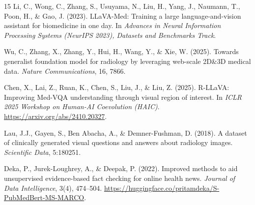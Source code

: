 \documentclass{article}
\begin{document}
\begin{thebibliography}{15}
Li, C., Wong, C., Zhang, S., Usuyama, N., Liu, H., Yang, J., Naumann, T., Poon, H., \& Gao, J. (2023). LLaVA-Med:
Training a large language-and-vision assistant for biomedicine in one day. In \emph{Advances in Neural Information
Processing Systems (NeurIPS 2023), Datasets and Benchmarks Track}.

Wu, C., Zhang, X., Zhang, Y., Hui, H., Wang, Y., \& Xie, W. (2025). Towards generalist foundation model for radiology
by leveraging web-scale 2D\&3D medical data. \emph{Nature Communications}, 16, 7866.

Chen, X., Lai, Z., Ruan, K., Chen, S., Liu, J., \& Liu, Z. (2025). R-LLaVA: Improving Med-VQA understanding through
visual region of interest. In \emph{ICLR 2025 Workshop on Human-AI Coevolution (HAIC)}.
\url{https://arxiv.org/abs/2410.20327}.

Lau, J.J., Gayen, S., Ben Abacha, A., \& Demner-Fushman, D. (2018). A dataset of clinically generated visual questions
and answers about radiology images. \emph{Scientific Data}, 5:180251.

Deka, P., Jurek-Loughrey, A., \& Deepak, P. (2022). Improved methods to aid unsupervised evidence-based fact checking
for online health news. \emph{Journal of Data Intelligence}, 3(4), 474--504.
\url{https://huggingface.co/pritamdeka/S-PubMedBert-MS-MARCO}.

\end{thebibliography}
\end{document}

